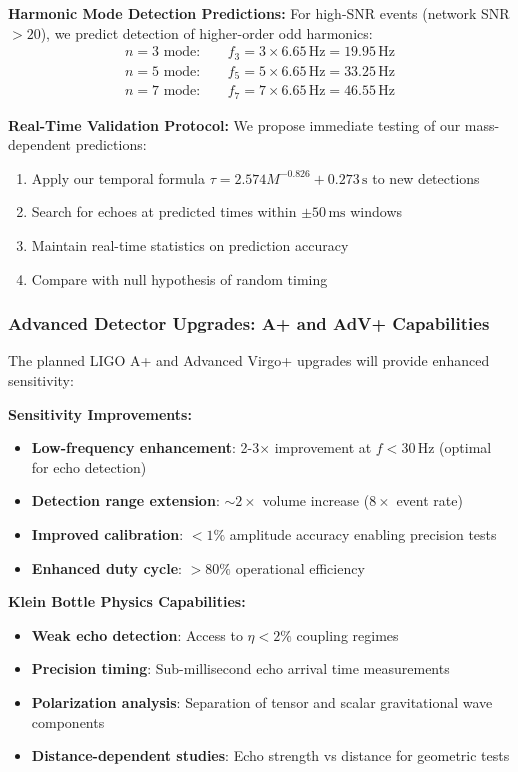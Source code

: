 \documentclass[reprint,amsmath,amssymb,aps,prd]{revtex4-2}
\newcommand{\Hz}{\,\text{Hz}}
\newcommand{\ms}{\,\text{ms}}
\newcommand{\s}{\,\text{s}}
\begin{document}
\textbf{Harmonic Mode Detection Predictions:}
For high-SNR events (network SNR $> 20$), we predict detection of higher-order odd harmonics:
\begin{align}
n = 3 \text{ mode}: \quad &f_3 = 3 \times 6.65\Hz = 19.95\Hz \\
n = 5 \text{ mode}: \quad &f_5 = 5 \times 6.65\Hz = 33.25\Hz \\
n = 7 \text{ mode}: \quad &f_7 = 7 \times 6.65\Hz = 46.55\Hz
\end{align}

\textbf{Real-Time Validation Protocol:}
We propose immediate testing of our mass-dependent predictions:
\begin{enumerate}
\item Apply our temporal formula $\tau = 2.574M^{-0.826} + 0.273\s$ to new detections
\item Search for echoes at predicted times within $\pm 50\ms$ windows
\item Maintain real-time statistics on prediction accuracy
\item Compare with null hypothesis of random timing
\end{enumerate}

\subsubsection{Advanced Detector Upgrades: A+ and AdV+ Capabilities}

The planned LIGO A+ and Advanced Virgo+ upgrades will provide enhanced sensitivity:

\textbf{Sensitivity Improvements:}
\begin{itemize}
\item \textbf{Low-frequency enhancement}: 2-3$\times$ improvement at $f < 30\Hz$ (optimal for echo detection)
\item \textbf{Detection range extension}: $\sim 2\times$ volume increase ($8\times$ event rate)
\item \textbf{Improved calibration}: $< 1\%$ amplitude accuracy enabling precision tests
\item \textbf{Enhanced duty cycle}: $> 80\%$ operational efficiency
\end{itemize}

\textbf{Klein Bottle Physics Capabilities:}
\begin{itemize}
\item \textbf{Weak echo detection}: Access to $\eta < 2\%$ coupling regimes
\item \textbf{Precision timing}: Sub-millisecond echo arrival time measurements
\item \textbf{Polarization analysis}: Separation of tensor and scalar gravitational wave components
\item \textbf{Distance-dependent studies}: Echo strength vs distance for geometric tests
\end{itemize}
\end{document}
